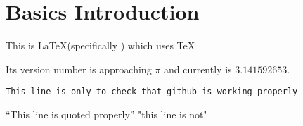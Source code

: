 \section{Basics Introduction}

This is \LaTeX (specifically \LaTeXe) which uses \TeX

Its version number is approaching $\pi$ and currently is $3.141592653$.

\texttt{This line is only to check that github is working properly}

\vspace{1cm}
``This line is quoted properly'' \newline
"this line is not"
